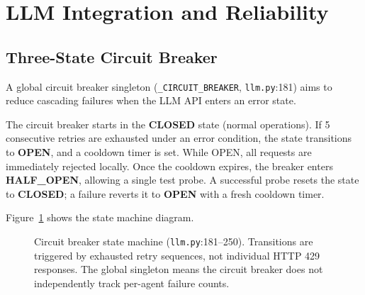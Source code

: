 \documentclass[12pt, a4paper, oneside, openany]{book}
\newcommand{\code}[1]{\texttt{#1}}
\newcommand{\file}[1]{\texttt{#1}}
\begin{document}
\section{LLM Integration and Reliability}
\label{sec:llm_integration}

\subsection{Three-State Circuit Breaker}

A global circuit breaker singleton (\code{\_CIRCUIT\_BREAKER},
\file{llm.py}:181) aims to reduce cascading failures when the LLM
API enters an error state.

The circuit breaker starts in the \textbf{CLOSED} state (normal operations). If 5 consecutive retries are exhausted under an error condition, the state transitions to \textbf{OPEN}, and a cooldown timer is set. While OPEN, all requests are immediately rejected locally. Once the cooldown expires, the breaker enters \textbf{HALF\_OPEN}, allowing a single test probe. A successful probe resets the state to \textbf{CLOSED}; a failure reverts it to \textbf{OPEN} with a fresh cooldown timer.

Figure~\ref{fig:cb_states} shows the state machine diagram.

\begin{figure}[H]
\centering
{}
\caption{Circuit breaker state machine (\file{llm.py}:181--250).
  Transitions are triggered by exhausted retry sequences, not
  individual HTTP 429 responses.  The global singleton means the
  circuit breaker does not independently track per-agent failure
  counts.}
\label{fig:cb_states}
\end{figure}
\end{document}
